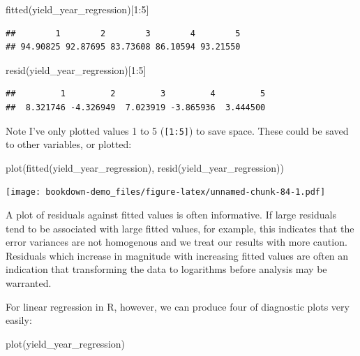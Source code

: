 \documentclass[
]{book}
\newenvironment{Shaded}{\begin{snugshade}}{\end{snugshade}}
\newcommand{\DecValTok}[1]{\textcolor[rgb]{0.00,0.00,0.81}{#1}}
\newcommand{\FunctionTok}[1]{\textcolor[rgb]{0.00,0.00,0.00}{#1}}
\newcommand{\NormalTok}[1]{#1}
\newcommand{\SpecialCharTok}[1]{\textcolor[rgb]{0.00,0.00,0.00}{#1}}
\begin{document}
\begin{Shaded}
\begin{Highlighting}[]
\FunctionTok{fitted}\NormalTok{(yield\_year\_regression)[}\DecValTok{1}\SpecialCharTok{:}\DecValTok{5}\NormalTok{]}
\end{Highlighting}
\end{Shaded}

\begin{verbatim}
##        1        2        3        4        5 
## 94.90825 92.87695 83.73608 86.10594 93.21550
\end{verbatim}

\begin{Shaded}
\begin{Highlighting}[]
\FunctionTok{resid}\NormalTok{(yield\_year\_regression)[}\DecValTok{1}\SpecialCharTok{:}\DecValTok{5}\NormalTok{]}
\end{Highlighting}
\end{Shaded}

\begin{verbatim}
##         1         2         3         4         5 
##  8.321746 -4.326949  7.023919 -3.865936  3.444500
\end{verbatim}

Note I've only plotted values 1 to 5 (\texttt{{[}1:5{]}}) to save space. These could be saved to other variables, or plotted:

\begin{Shaded}
\begin{Highlighting}[]
\FunctionTok{plot}\NormalTok{(}\FunctionTok{fitted}\NormalTok{(yield\_year\_regression), }\FunctionTok{resid}\NormalTok{(yield\_year\_regression))}
\end{Highlighting}
\end{Shaded}

\texttt{[image: bookdown-demo\_files/figure-latex/unnamed-chunk-84-1.pdf]}

A plot of residuals against fitted values is often informative. If large residuals tend to be associated with large fitted values, for example, this indicates that the error variances are not homogenous and we treat our results with more caution. Residuals which increase in magnitude with increasing fitted values are often an indication that transforming the data to logarithms before analysis may be warranted.

For linear regression in R, however, we can produce four of diagnostic plots very easily:

\begin{Shaded}
\begin{Highlighting}[]
\FunctionTok{plot}\NormalTok{(yield\_year\_regression)}
\end{Highlighting}
\end{Shaded}
\end{document}
